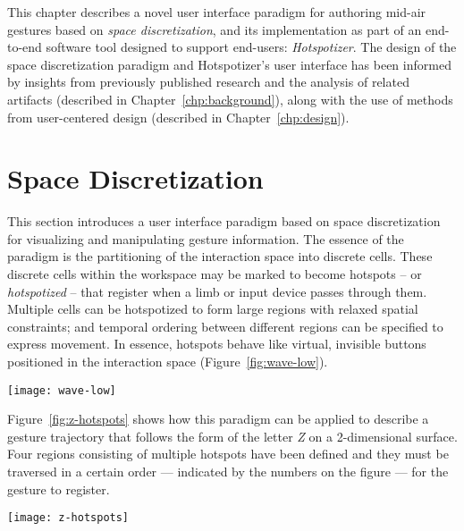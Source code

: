 This chapter describes a novel user interface paradigm for authoring mid-air gestures based on \emph{space discretization}, and its implementation as part of an end-to-end software tool designed to support end-users: \emph{Hotspotizer}. The design of the space discretization paradigm and Hotspotizer's user interface has been informed by insights from previously published research and the analysis of related artifacts (described in Chapter~\ref{chp:background}), along with the use of methods from user-centered design (described in Chapter~\ref{chp:design}).

\section{Space Discretization}

This section introduces a user interface paradigm based on space discretization for visualizing and manipulating gesture information. The essence of the paradigm is the partitioning of the interaction space into discrete cells. These discrete cells within the workspace may be marked to become hotspots – or \emph{hotspotized} – that register when a limb or input device passes through them. Multiple cells can be hotspotized to form large regions with relaxed spatial constraints; and temporal ordering between different regions can be specified to express movement. In essence, hotspots behave like virtual, invisible buttons positioned in the interaction space (Figure~\ref{fig:wave-low}).

\begin{SCfigure}[5][b]
\centering
\texttt{[image: wave-low]}
\caption{Hotspots behave like virtual buttons set in the interaction space. A wide variety of gestures can be described in as sequences of hotspot configurations.}
\label{fig:wave-low}
\end{SCfigure}

Figure~\ref{fig:z-hotspots} shows how this paradigm can be applied to describe a gesture trajectory that follows the form of the letter \emph{Z} on a 2-dimensional surface. Four regions consisting of multiple hotspots have been defined and they must be traversed in a certain order --- indicated by the numbers on the figure --- for the gesture to register.

\begin{SCfigure}[3][t]
\centering
\texttt{[image: z-hotspots]}
\caption{A 2-dimensional surface "Z" gesture defined using ordered hotspots in discretized space.}
\label{fig:z-hotspots}
\end{SCfigure}

